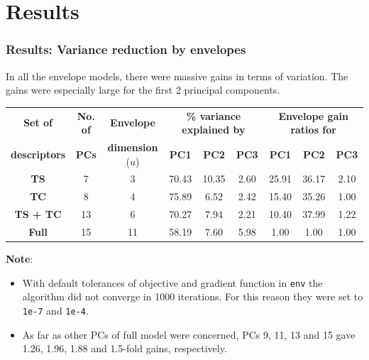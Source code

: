 \documentclass[handout,10pt]{beamer}
\begin{document}
\section{Results}
\begin{frame}
\frametitle{Results: Variance reduction by envelopes}
In all the envelope models, there were massive gains in terms of variation. The gains were especially large for the first 2 principal components.
\vspace{.2cm}

\begin{scriptsize}
\begin{table}\centering
    \begin{tabular}{|c|c|c||c|c|c|c|c|c|}\hline
    \textbf{Set of} & \textbf{No. of} & \textbf{Envelope} & 
    \multicolumn{3}{c|}{\textbf{\% variance explained by}} & \multicolumn{3}{c|}{\textbf{Envelope gain ratios for}}\\\cline{4-9}
    \textbf{descriptors}                  & \textbf{PCs}                                                 & \textbf{dimension} ($u$) & \textbf{PC1}                      & \textbf{PC2}   & \textbf{PC3}  & \textbf{PC1}                & \textbf{PC2}   & \textbf{PC3}  \\\hline\hline
    \textbf{TS}                 & 7                                                 & 3                        & 70.43                    & 10.35 & 2.60 & 25.91              & 36.17 & 2.10 \\ \hline
    \textbf{TC}                 & 8                                                 & 4                        & 75.89                    & 6.52  & 2.42 & 15.40              & 35.26 & 1.00 \\\hline
    \textbf{TS + TC}            & 13                                                & 6                        & 70.27                    & 7.94  & 2.21 & 10.40              & 37.99 & 1.22 \\\hline
    \textbf{Full} & 15 & 11 & 58.19 & 7.60 & 5.98 & 1.00 & 1.00 & 1.00 \\\hline
    \end{tabular}
\end{table}
\end{scriptsize}
\vspace{.2cm}
\textbf{Note}:
\begin{itemize}
\item With default tolerances of objective and gradient function in \texttt{env} the algorithm did not converge in 1000 iterations. For this reason they were set to \texttt{1e-7} and \texttt{1e-4}.
\vspace{.2cm}
\item As far as other PCs of full model were concerned, PCs 9, 11, 13 and 15 gave 1.26, 1.96, 1.88 and 1.5-fold gains, respectively.
\end{itemize}
\end{frame}
\end{document}
